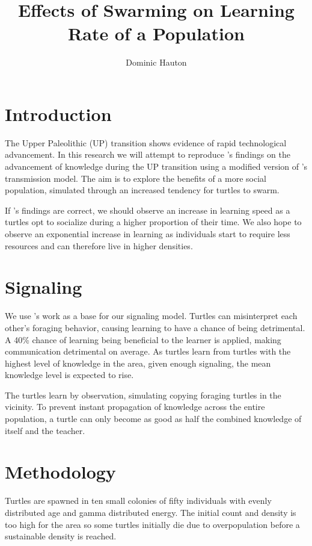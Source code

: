\documentclass[a4paper,12pt,twocolumn]{report}
\title{Effects of Swarming on Learning Rate of a Population}
\author{Dominic Hauton}
\begin{document}
\maketitle


\section{Introduction}

The Upper Paleolithic (UP) transition shows evidence of rapid technological advancement. In this research we will attempt to reproduce \cite{powell2009late}'s findings on the advancement of knowledge during the UP transition using a modified version of \cite{henrich2004demography}'s transmission model. The aim is to explore the benefits of a more social population, simulated through an increased tendency for turtles to swarm.

If \cite{powell2009late}'s findings are correct, we should observe an increase in learning speed as a turtles opt to socialize during a higher proportion of their time. We also hope to observe an exponential increase in learning as individuals start to require less resources and can therefore live in higher densities.

\section{Signaling}

We use \cite{henrich2004demography}'s work as a base for our signaling model. Turtles can misinterpret each other's foraging behavior, causing learning to have a chance of being detrimental. A 40\% chance of learning being beneficial to the learner is applied, making communication detrimental on average. As turtles learn from turtles with the highest level of knowledge in the area, given enough signaling, the mean knowledge level is expected to rise.

The turtles learn by observation, simulating copying foraging turtles in the vicinity. To prevent instant propagation of knowledge across the entire population, a turtle can only become as good as half the combined knowledge of itself and the teacher.

\section{Methodology}

Turtles are spawned in ten small colonies of fifty individuals with evenly distributed age and gamma distributed energy. The initial count and density is too high for the area so some turtles initially die due to overpopulation before a sustainable density is reached.
\end{document}
